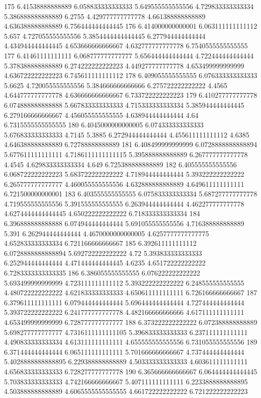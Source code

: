 175 6.41538888888889 6.058833333333333 5.649555555555556 4.729833333333334 5.386888888888889 6.2755 4.429777777777778 4.661388888888889 4.636388888888889 6.756444444444445
176 6.414000000000001 6.063111111111112 5.657 4.727055555555556 5.3854444444444445 6.277944444444444 4.434944444444445 4.653666666666667 4.632777777777778 6.7540555555555555
177 6.41461111111111 6.068777777777777 5.656444444444444 4.722444444444444 5.378388888888889 6.274222222222223 4.449277777777778 4.653499999999999 4.636722222222223 6.745611111111112
178 6.409055555555555 6.076333333333333 5.6625 4.720055555555556 5.384666666666666 6.275722222222222 4.4565 4.644777777777778 4.636666666666667 6.733722222222223
179 6.410277777777778 6.074888888888888 5.667833333333333 4.715333333333334 5.385944444444445 6.279166666666667 4.456055555555555 4.638944444444444 4.64 6.7315555555555555
180 6.4045000000000005 6.074333333333333 5.676833333333333 4.7145 5.3885 6.272944444444444 4.455611111111112 4.6385 4.646388888888889 6.72788888888889
181 6.408499999999999 6.0728888888888894 5.677611111111111 4.7186111111111115 5.395888888888889 6.267777777777778 4.4545 4.629833333333334 4.649 6.725388888888889
182 6.405555555555556 6.068722222222223 5.683722222222222 4.718944444444444 5.393222222222222 6.265777777777777 4.460055555555556 4.632888888888889 4.649611111111111 6.721500000000001
183 6.403555555555555 6.075833333333334 5.687277777777778 4.719555555555556 5.391555555555555 6.263944444444444 4.462277777777778 4.6274444444444445 4.650222222222222 6.718333333333334
184 6.396888888888888 6.074944444444444 5.691055555555556 4.716388888888889 5.391 6.262944444444444 4.4670000000000005 4.6257777777777775 4.652833333333334 6.721166666666667
185 6.392611111111112 6.0728888888888894 5.692722222222222 4.72 5.393833333333333 6.252944444444444 4.471444444444445 4.6235 4.651722222222222 6.7283333333333335
186 6.386055555555555 6.076222222222222 5.693499999999999 4.723111111111112 5.393222222222222 6.248555555555555 4.480722222222222 4.621833333333333 4.650611111111111 6.726166666666667
187 6.379611111111111 6.079444444444444 5.696444444444444 4.727444444444444 5.393722222222222 6.241777777777778 4.482166666666666 4.617111111111111 4.653499999999999 6.728777777777777
188 6.373222222222222 6.072388888888889 5.698277777777777 4.7316111111111105 5.396833333333333 6.237111111111111 4.490833333333334 4.613111111111111 4.655555555555556 6.731055555555556
189 6.371444444444444 6.065111111111111 5.701666666666667 4.737444444444444 5.4028888888888895 6.229388888888889 4.503333333333333 4.603611111111111 4.656833333333333 6.728277777777778
190 6.365666666666667 6.064444444444445 5.703833333333333 4.742166666666667 5.407111111111111 6.2233888888888895 4.503888888888889 4.6065555555555555 4.661722222222222 6.721222222222223
